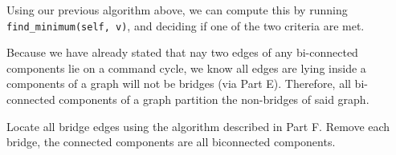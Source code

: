 \documentclass[12pt]{scrartcl}
\begin{document}
Using our previous algorithm above, we can compute this by running \verb|find_minimum(self, v)|, and deciding if one of the two criteria are met.

\subproblem{} %
Because we have already stated that nay two edges of any bi-connected components lie on a command cycle, we know all edges are lying inside a components of a graph will not be bridges (via Part E). Therefore, all bi-connected components of a graph partition the non-bridges of said graph.

\subproblem{} %
Locate all bridge edges using the algorithm described in Part F. Remove each bridge, the connected components are all biconnected components.
\end{document}
